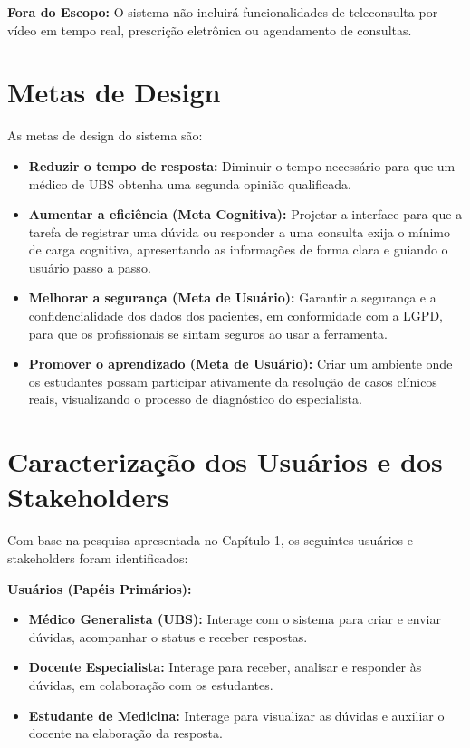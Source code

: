 \documentclass[12pt, a4paper, oneside]{abntex2}
\begin{document}
\textbf{Fora do Escopo:} O sistema não incluirá funcionalidades de teleconsulta por vídeo em tempo real, prescrição eletrônica ou agendamento de consultas.

\section{Metas de Design}
\label{sec:metas_design}
As metas de design do sistema são:
\begin{itemize}
    \item \textbf{Reduzir o tempo de resposta:} Diminuir o tempo necessário para que um médico de UBS obtenha uma segunda opinião qualificada.
    \item \textbf{Aumentar a eficiência (Meta Cognitiva):} Projetar a interface para que a tarefa de registrar uma dúvida ou responder a uma consulta exija o mínimo de carga cognitiva, apresentando as informações de forma clara e guiando o usuário passo a passo.
    \item \textbf{Melhorar a segurança (Meta de Usuário):} Garantir a segurança e a confidencialidade dos dados dos pacientes, em conformidade com a LGPD, para que os profissionais se sintam seguros ao usar a ferramenta.
    \item \textbf{Promover o aprendizado (Meta de Usuário):} Criar um ambiente onde os estudantes possam participar ativamente da resolução de casos clínicos reais, visualizando o processo de diagnóstico do especialista.
\end{itemize}

\section{Caracterização dos Usuários e dos Stakeholders}
\label{sec:caracterizacao_usuarios}
Com base na pesquisa apresentada no Capítulo 1, os seguintes usuários e stakeholders foram identificados:

\textbf{Usuários (Papéis Primários):}
\begin{itemize}
    \item \textbf{Médico Generalista (UBS):} Interage com o sistema para criar e enviar dúvidas, acompanhar o status e receber respostas.
    \item \textbf{Docente Especialista:} Interage para receber, analisar e responder às dúvidas, em colaboração com os estudantes.
    \item \textbf{Estudante de Medicina:} Interage para visualizar as dúvidas e auxiliar o docente na elaboração da resposta.
\end{itemize}
\end{document}
